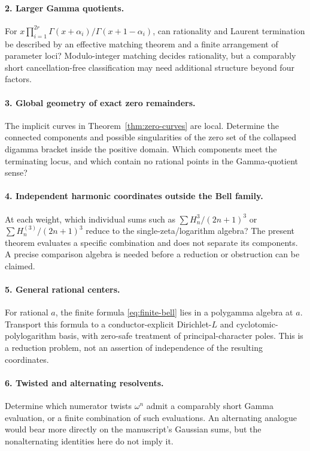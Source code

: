 \documentclass[11pt,a4paper]{article}
\numberwithin{equation}{section}
\theoremstyle{definition}\newtheorem{definition}[theorem]{Definition}
\theoremstyle{remark}\newtheorem{remark}[theorem]{Remark}
\begin{document}
\paragraph{2. Larger Gamma quotients.}
For $x\prod_{i=1}^{2r}\Gamma(x+\alpha_i)/\Gamma(x+1-\alpha_i)$,
can rationality and Laurent termination be described by an effective
matching theorem and a finite arrangement of parameter loci? Modulo-integer
matching decides rationality, but a comparably short cancellation-free
classification may need additional structure beyond four factors.

\paragraph{3. Global geometry of exact zero remainders.}
The implicit curves in Theorem~\ref{thm:zero-curves} are local. Determine
the connected components and possible singularities of the zero set of
the collapsed digamma bracket inside the positive domain. Which components
meet the terminating locus, and which contain no rational points in the
Gamma-quotient sense?

\paragraph{4. Independent harmonic coordinates outside the Bell family.}
At each weight, which individual sums such as
$\sum H_n^3/(2n+1)^3$ or $\sum H_n^{(3)}/(2n+1)^3$ reduce to the
single-zeta/logarithm algebra? The present theorem evaluates a specific
combination and does not separate its components. A precise comparison
algebra is needed before a reduction or obstruction can be claimed.

\paragraph{5. General rational centers.}
For rational $a$, the finite formula \eqref{eq:finite-bell} lies in a
polygamma algebra at $a$. Transport this formula to a conductor-explicit
Dirichlet-$L$ and cyclotomic-polylogarithm basis, with zero-safe treatment
of principal-character poles. This is a reduction problem, not an
assertion of independence of the resulting coordinates.

\paragraph{6. Twisted and alternating resolvents.}
Determine which numerator twists $\omega^n$ admit a comparably short
Gamma evaluation, or a finite combination of such evaluations.
An alternating analogue would bear more directly on the manuscript's
Gaussian sums, but the nonalternating identities here do not imply it.
\end{document}
